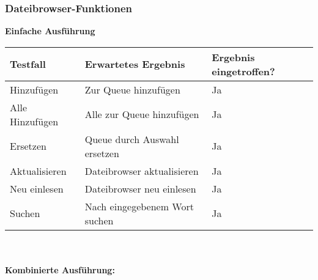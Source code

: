 \newpage
\subsubsection{Dateibrowser-Funktionen}
\textbf{Einfache Ausführung}
\\
\begin{tabularx}{\textwidth}{|X|p{7cm}|p{3cm}|}
    \hline
    \textbf{Testfall} & \textbf{Erwartetes Ergebnis} & \textbf{Ergebnis eingetroffen?}\\
    \hline
    Hinzufügen & Zur Queue hinzufügen & Ja\\
    \hline
    Alle Hinzufügen & Alle zur Queue hinzufügen & Ja\\
    \hline
    Ersetzen & Queue durch Auswahl ersetzen & Ja\\
    \hline
    Aktualisieren & Dateibrowser aktualisieren & Ja\\
    \hline
    Neu einlesen & Dateibrowser neu einlesen & Ja\\
    \hline
    Suchen & Nach eingegebenem Wort suchen & Ja\\
    \hline
\end{tabularx}
\\
\\
\textbf{Kombinierte Ausführung:}
\\
